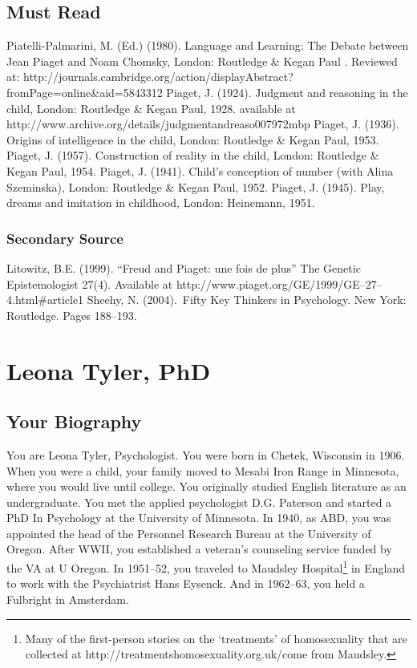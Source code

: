 \section{Must Read}
\label{mustread}

Piatelli-Palmarini, M. (Ed.) (1980). Language and Learning: The Debate between Jean Piaget and Noam Chomsky, London: Routledge \& Kegan Paul . Reviewed at: http:\slash \slash journals.cambridge.org\slash action\slash displayAbstract?fromPage=online\&aid=5843312
Piaget, J. (1924). Judgment and reasoning in the child, London: Routledge \& Kegan Paul, 1928. available at http:\slash \slash www.archive.org\slash details\slash judgmentandreaso007972mbp
Piaget, J. (1936). Origins of intelligence in the child, London: Routledge \& Kegan Paul, 1953.
Piaget, J. (1957). Construction of reality in the child, London: Routledge \& Kegan Paul, 1954.
Piaget, J. (1941). Child's conception of number (with Alina Szeminska), London: Routledge \& Kegan Paul, 1952.
Piaget, J. (1945). Play, dreams and imitation in childhood, London: Heinemann, 1951.

\subsection{Secondary Source}
\label{secondarysource}

Litowitz, B.E. (1999). “Freud and Piaget: une fois de plus” The Genetic Epistemologist 27(4). Available at http:\slash \slash www.piaget.org\slash GE\slash 1999\slash GE--27--4.html\#article1
 Sheehy, N. (2004). Fifty Key Thinkers in Psychology. New York: Routledge. Pages 188--193.

\chapter{Leona Tyler, PhD}
\label{leonatylerphd}

\section{Your Biography}
\label{yourbiography}

You are Leona Tyler, Psychologist.
You were born in Chetek, Wisconsin in 1906. When you were a child, your family moved to Mesabi Iron Range in Minnesota, where you would live until college.
You originally studied English literature as an undergraduate. You met the applied psychologist D.G. Paterson and started a PhD In Psychology at the University of Minnesota. In 1940, as ABD, you was appointed the head of the Personnel Research Bureau at the University of Oregon. After WWII, you established a veteran’s counseling service funded by the VA at U Oregon. In 1951--52, you traveled to Maudsley Hospital\footnote{Many of the first-person stories on the `treatments' of homosexuality that are collected at http:\slash \slash treatmentshomosexuality.org.uk\slash  come from Maudsley.} in England to work with the Psychiatrist Hans Eysenck. And in 1962--63, you held a Fulbright in Amsterdam.


